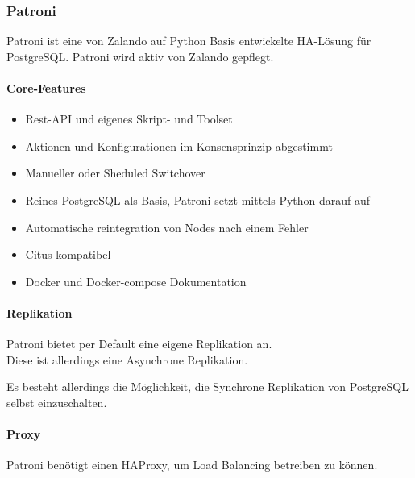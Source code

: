 
\begin{flushleft}
    \subsubsection{Patroni}
    Patroni ist eine von Zalando auf Python Basis entwickelte HA-Lösung für PostgreSQL.
    Patroni wird aktiv von Zalando gepflegt.
\end{flushleft}
\begin{flushleft}
    \paragraph{Core-Features}
    \begin{itemize}
        \item Rest-API und eigenes Skript- und Toolset
        \item Aktionen und Konfigurationen im Konsensprinzip abgestimmt
        \item Manueller oder Sheduled Switchover
        \item Reines PostgreSQL als Basis, Patroni setzt mittels Python darauf auf
        \item Automatische reintegration von Nodes nach einem Fehler
        \item Citus kompatibel
        \item Docker und Docker-compose Dokumentation
    \end{itemize}
\end{flushleft}
\begin{flushleft}
    \paragraph{Replikation}
    Patroni bietet per Default eine eigene Replikation an.\\
    Diese ist allerdings eine Asynchrone Replikation.
\begin{flushleft}
    Es besteht allerdings die Möglichkeit, die Synchrone Replikation von PostgreSQL selbst einzuschalten.
\end{flushleft}
\end{flushleft}
\begin{flushleft}
    \paragraph{Proxy}
    Patroni benötigt einen \Gls{HAProxy}, um Load Balancing betreiben zu können\cite{VYXTI7BS}.
\end{flushleft}
